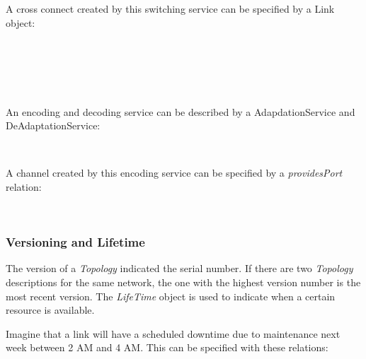 A cross connect created by this switching service can be specified by a Link object:

 \\
 \\
 \\
 \\

An encoding and decoding service can be described by a AdapdationService and DeAdaptationService:

 \\

A channel created by this encoding service can be specified by a \emph{providesPort} relation:

 \\


\subsubsection{Versioning and Lifetime}

The version of a \emph{Topology} indicated the serial number. If there are two \emph{Topology} descriptions for the same network, the one with the highest version number is the most recent version. The \emph{LifeTime} object is used to indicate when a certain resource is available.

Imagine that a link will have a scheduled downtime due to maintenance next week between 2 AM and 4 AM. This can be specified with these relations:

 \\
 \\
 \\
 \\

